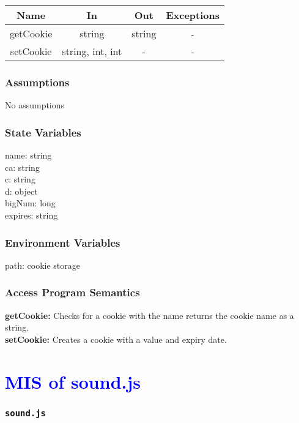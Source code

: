\documentclass[11pt, oneside]{article}   	%
\begin{document}
\begin{center}
\begin{tabular}{ |c|c|c|c| } 
 \hline
 Name & In & Out & Exceptions \\ 
 \hline \hline
 getCookie & string & string & - \\ 
 setCookie & string, int, int & - & - \\ 
 \hline
\end{tabular}
\end{center}

\subsubsection{Assumptions}
No assumptions

\subsubsection{State Variables}
name: string\\
ca: string\\
c: string\\
d: object\\
bigNum: long\\
expires: string\\
\subsubsection{Environment Variables}
path: cookie storage

\subsubsection{Access Program Semantics} 
 \textbf{getCookie:} Checks for a cookie with the name returns the cookie name as a string.\\
 \textbf{setCookie:} Creates a cookie with a value and expiry date.




\section{\textcolor{blue}{MIS of sound.js}}
\subsubsection{\texttt{sound.js}}
\end{document}
